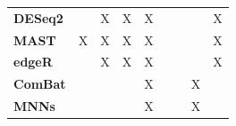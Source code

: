 \begin{table}
{\begin{small}
\begin{tabular}{lcccccccc}
\textbf{DESeq2}          &                  & X                                                                     & X                     & X                                                                 &                                                                     &                                                                              &                     & X                                                                          \\[0.2cm]
\textbf{MAST}            & X                & X                                                                     & X                     & X                                                                 &                                                                     &                                                                              &                     & X                                                                          \\[0.2cm]
\textbf{edgeR}           &                  & X                                                                     & X                     & X                                                                 &                                                                     &                                                                              &                     & X                                                                          \\[0.2cm]

\textbf{ComBat}          &                  &                                                                       &                       & X                                                                 &                                                                     &                                                                              & X                   &                                                                            \\[0.2cm]
\textbf{MNNs}            &                  &                                                                       &                       & X                                                                 &                                                                     &                                                                              & X                   &                                                                            \\[0.2cm]


\end{tabular}
\end{small}}
\end{table}
